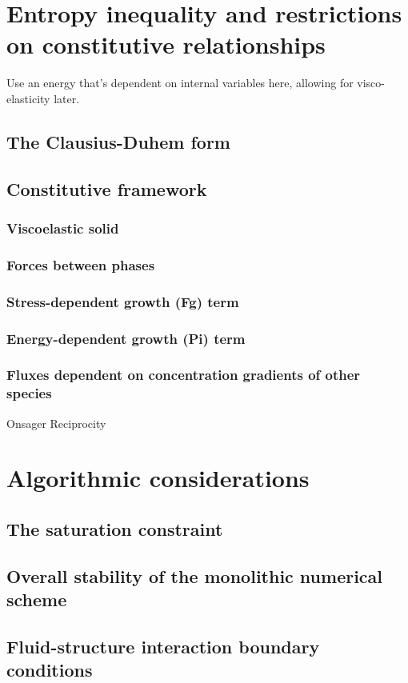 \section{Entropy inequality and restrictions on constitutive
  relationships}
\label{eu-entropy-inequality}
Use an energy that's dependent on internal variables here, allowing for visco-elasticity later.
\subsection{The Clausius-Duhem form}
\subsection{Constitutive framework}
\subsubsection{Viscoelastic solid}
\subsubsection{Forces between phases}
\subsubsection{Stress-dependent growth (Fg) term}
\subsubsection{Energy-dependent growth (Pi) term}
\subsubsection{Fluxes dependent on concentration gradients of other
  species}
Onsager Reciprocity
\section{Algorithmic considerations}
\label{eu-algorithmic-considerations}
\subsection{The saturation constraint}
\subsection{Overall stability of the monolithic numerical scheme}
\subsection{Fluid-structure interaction boundary conditions}


%

